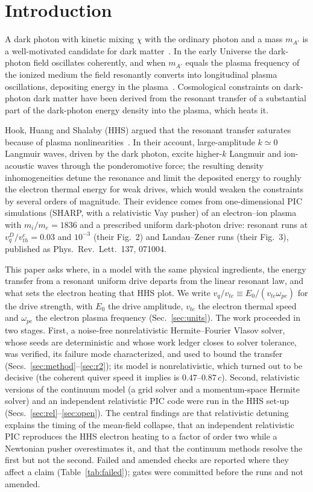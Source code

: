 \documentclass[aps,pre,reprint,floatfix,amsmath,amssymb,nofootinbib,superscriptaddress]{revtex4-2}
\newcommand{\vq}{v_q/v_{te}}
\newcommand{\wpe}{\omega_{pe}}
\begin{document}
\section{Introduction}
A dark photon with kinetic mixing $\chi$ with the ordinary photon and a mass $m_{A'}$ is a well-motivated candidate for dark matter~\cite{Fabbrichesi2020}. In the early Universe the dark-photon field oscillates coherently, and when $m_{A'}$ equals the plasma frequency of the ionized medium the field resonantly converts into longitudinal plasma oscillations, depositing energy in the plasma~\cite{DubovskyHC2015,McDermottWitte2020,Witte2020}. Cosmological constraints on dark-photon dark matter have been derived from the resonant transfer of a substantial part of the dark-photon energy density into the plasma, which heats it.

Hook, Huang and Shalaby (HHS) argued that the resonant transfer saturates because of plasma nonlinearities~\cite{HHS2026}. In their account, large-amplitude $k\simeq0$ Langmuir waves, driven by the dark photon, excite higher-$k$ Langmuir and ion-acoustic waves through the ponderomotive force; the resulting density inhomogeneities detune the resonance and limit the deposited energy to roughly the electron thermal energy for weak drives, which would weaken the constraints by several orders of magnitude. Their evidence comes from one-dimensional PIC simulations (SHARP, with a relativistic Vay pusher) of an electron--ion plasma with $m_i/m_e=1836$ and a prescribed uniform dark-photon drive: resonant runs at $v_q^D/v_{th}^e=0.03$ and $10^{-3}$ (their Fig.~2) and Landau--Zener runs (their Fig.~3), published as Phys.\ Rev.\ Lett.\ 137, 071004.

This paper asks where, in a model with the same physical ingredients, the energy transfer from a resonant uniform drive departs from the linear resonant law, and what sets the electron heating that HHS plot. We write $\vq\equiv E_0/(v_{te}\wpe)$ for the drive strength, with $E_0$ the drive amplitude, $v_{te}$ the electron thermal speed and $\wpe$ the electron plasma frequency (Sec.~\ref{sec:units}). The work proceeded in two stages. First, a noise-free nonrelativistic Hermite--Fourier Vlasov solver, whose seeds are deterministic and whose work ledger closes to solver tolerance, was verified, its failure mode characterized, and used to bound the transfer (Secs.~\ref{sec:method}--\ref{sec:r2}); its model is nonrelativistic, which turned out to be decisive (the coherent quiver speed it implies is $0.47$--$0.87\,c$). Second, relativistic versions of the continuum model (a grid solver and a momentum-space Hermite solver) and an independent relativistic PIC code were run in the HHS set-up (Secs.~\ref{sec:rel}--\ref{sec:open}). The central findings are that relativistic detuning explains the timing of the mean-field collapse, that an independent relativistic PIC reproduces the HHS electron heating to a factor of order two while a Newtonian pusher overestimates it, and that the continuum methods resolve the first but not the second. Failed and amended checks are reported where they affect a claim (Table~\ref{tab:failed}); gates were committed before the runs and not amended.
\end{document}

